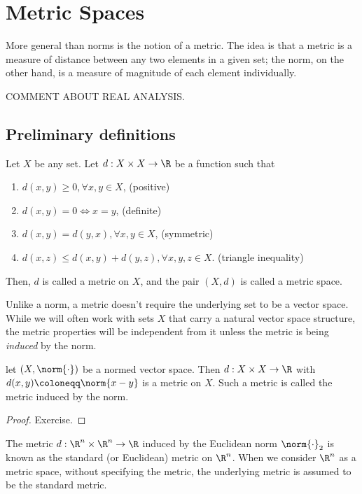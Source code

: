 \section{Metric Spaces}
More general than norms is the notion of a metric. The idea is that a metric is a measure of distance between any two elements in a given set; the norm, on the other hand, is a measure of magnitude of each element individually.

COMMENT ABOUT REAL ANALYSIS.

\subsection{Preliminary definitions}
\begin{ndfn}
  Let $X$ be any set. Let $d : X \times X \to \R$ be a function such that
  \begin{enumerate}
  \item $d(x,y) \geq 0, \forall x,y \in X$, \hfill (positive)
  \item $d(x,y) = 0 \iff x=y$, \hfill (definite)
  \item $d(x,y) = d(y,x), \forall x,y \in X$, \hfill (symmetric)
  \item $d(x,z) \leq d(x,y) + d(y,z), \forall x,y,z \in X$. \hfill (triangle inequality)
  \end{enumerate}
  Then, $d$ is called a metric on $X$, and the pair $(X,d)$ is called a metric space.
\end{ndfn}

Unlike a norm, a metric doesn't require the underlying set to be a vector space. While we will often work with sets $X$ that carry a natural vector space structure, the metric properties will be independent from it unless the metric is being \emph{induced} by the norm.

\begin{nprop}
  let $(X, \norm{\cdot})$ be a normed vector space. Then $d : X \times X \to \R$ with $d(x,y) \coloneqq \norm{x-y}$ is a metric on $X$. Such a metric is called the metric induced by the norm.
\end{nprop}
\begin{proof}
  Exercise.
\end{proof}

The metric $d:\R^n \times \R^n \to \R$ induced by the Euclidean norm $\norm{\cdot}_2$ is known as the standard (or Euclidean) metric on $\R^n$. When we consider $\R^n$ as a metric space, without specifying the metric, the underlying metric is assumed to be the standard metric.

